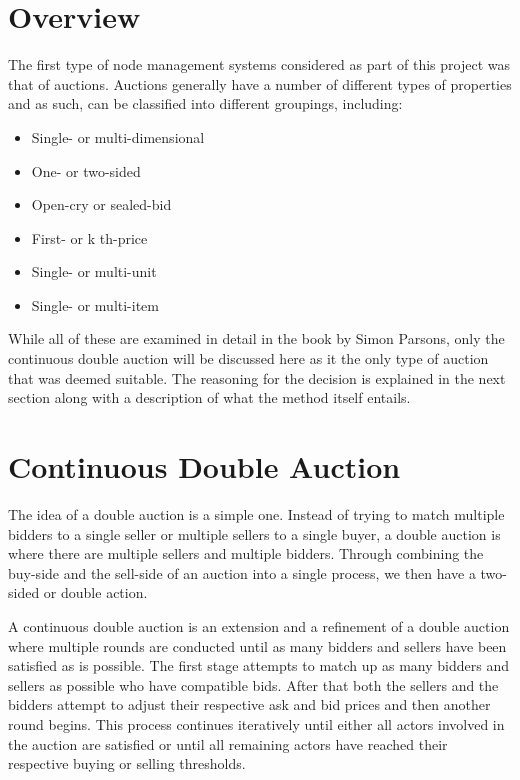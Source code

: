 \documentclass[a4paper, notitlepage]{report}
\begin{document}
\section{Overview}
\label{sec:orgfc747c8}
The first type of node management systems considered as part of this project was
that of auctions. Auctions generally have a number of different types of
properties \cite{parsons2011auctions} and as such, can be classified into
different groupings, including: 

\begin{itemize}
\item Single- or multi-dimensional
\item One- or two-sided
\item Open-cry or sealed-bid
\item First- or k th-price
\item Single- or multi-unit
\item Single- or multi-item
\end{itemize}

While all of these are examined in detail in the book by Simon Parsons, only the
continuous double auction will be discussed here as it the only type of auction
that was deemed suitable. The reasoning for the decision is explained in the
next section along with a description of what the method itself entails.
\section{Continuous Double Auction}
\label{sec:org299029e}
The idea of a double auction is a simple one. Instead of trying to match
multiple bidders to a single seller or multiple sellers to a single buyer, a
double auction is where there are multiple sellers and multiple bidders. Through
combining the buy-side and the sell-side of an auction into a single process, we
then have a two-sided or double action. 

A continuous double auction is an extension and a refinement of a double auction
where multiple rounds are conducted until as many bidders and sellers have been
satisfied as is possible. The first stage attempts to match up as many bidders
and sellers as possible who have compatible bids. After that both the sellers
and the bidders attempt to adjust their respective ask and bid prices and then
another round begins. This process continues iteratively until either all actors
involved in the auction are satisfied or until all remaining actors have reached
their respective buying or selling thresholds. 
\end{document}
